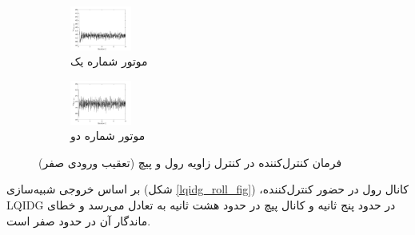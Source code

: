 \begin{figure}
	\centering
	\begin{subfigure}
		\centering
		\includegraphics[width=2cm]{../Figures/MIL/LQIDG/Roll_Pitch/lqidg_roll_pitch_Omega_1.png}
		\caption{موتور شماره یک}
	\end{subfigure}
	\begin{subfigure}
	\centering
	\includegraphics[width=2cm]{../Figures/MIL/LQIDG/Roll_Pitch/lqidg_roll_pitch_Omega_2.png}
	\caption{موتور شماره دو}
\end{subfigure}
	\caption{‫‪فرمان کنترل‌کننده در کنترل زاویه رول و پیچ (تعقیب ورودی صفر)}
\end{figure}


بر اساس خروجی شبیه‌سازی (شکل
\ref{lqidg_roll_fig})
،کانال رول در حضور کنترل‌کننده LQIDG در حدود پنج ثانیه و کانال پیچ در حدود هشت ثانیه به تعادل می‌رسد و خطای ماندگار آن در حدود صفر است.